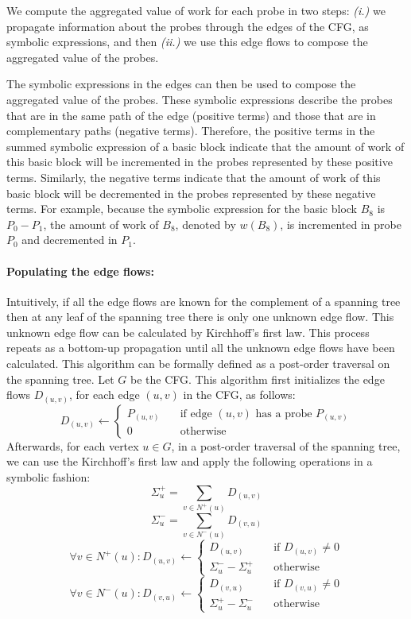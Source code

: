 We compute the aggregated value of work for each probe in two steps:
\textit{(i.)} we propagate information about the probes through the edges of the CFG,
as symbolic expressions, and then \textit{(ii.)} we use this edge flows
to compose the aggregated value of the probes.

The symbolic expressions in the edges can then be used to compose the aggregated
value of the probes.
These symbolic expressions describe the probes that are in the same path of the
edge (positive terms) and those that are in complementary paths (negative
terms).
Therefore, the positive terms in the summed symbolic expression of a
basic block indicate that the amount of work of this basic block will be
incremented in the probes represented by these positive terms.
Similarly, the negative terms indicate that the amount of work of this basic block
will be decremented in the probes represented by these negative terms.
For example, because the symbolic expression for the basic block $B_8$ is $P_0 - P_1$,
the amount of work of $B_8$, denoted by $w(B_8)$, is incremented in probe $P_0$
and decremented in $P_1$.

\paragraph{Populating the edge flows:}
Intuitively, if all the edge flows are known for the complement of a spanning tree
then at any leaf of the spanning tree there is only one unknown edge flow.
This unknown edge flow can be calculated by Kirchhoff's first law.
This process repeats as a bottom-up propagation until all the unknown edge flows
have been calculated.
This algorithm can be formally defined as a post-order traversal on the spanning
tree.
Let $G$ be the CFG.
This algorithm first initializes the edge flows $D_{(u,v)}$, for each edge
$(u,v)$ in the CFG, as follows:
\[
D_{(u,v)} \gets
\begin{cases}
    P_{(u,v)} & \quad \text{if edge $(u,v)$ has a probe $P_{(u,v)}$}\\
    0       & \quad \text{otherwise}
\end{cases}
\]
Afterwards, for each vertex $u\in G$, in a post-order traversal of the spanning tree,
we can use the Kirchhoff's first law and apply the following operations
in a symbolic fashion:
\[
\Sigma^+_u = \sum_{v\in N^+(u)} D_{(u,v)}
\]
\[
\Sigma^-_u = \sum_{v\in N^-(u)} D_{(v,u)}
\]
\[
\forall v\in N^+(u):  D_{(u,v)} \gets
\begin{cases}
    D_{(u,v)} & \quad \text{if $D_{(u,v)}\neq 0$}\\
    \Sigma^-_u - \Sigma^+_u       & \quad \text{otherwise}
\end{cases}
\]
\[
\forall v\in N^-(u):  D_{(v,u)} \gets
\begin{cases}
    D_{(v,u)} & \quad \text{if $D_{(v,u)}\neq 0$}\\
    \Sigma^+_u - \Sigma^-_u       & \quad \text{otherwise}
\end{cases}
\]

